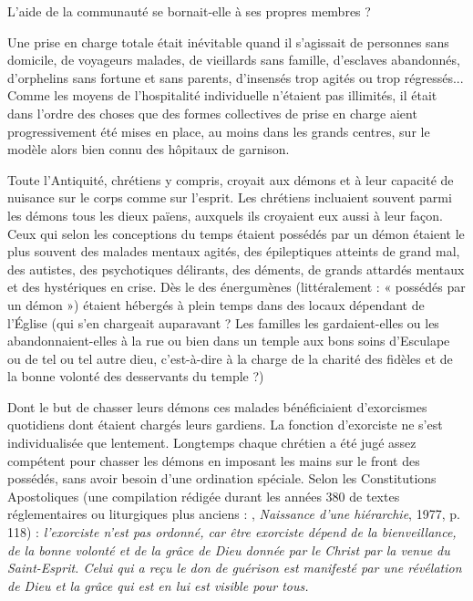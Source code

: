 L'aide de la communauté se bornait-elle à ses propres membres ? 

 Une prise en charge totale était inévitable quand il s'agissait de personnes sans domicile, de voyageurs malades, de vieillards sans famille, d'esclaves abandonnés, d'orphelins sans fortune et sans parents, d'insensés trop agités ou trop régressés... Comme les moyens de l'hospitalité individuelle n'étaient pas illimités, il était dans l'ordre des choses que des formes collectives de prise en charge aient progressivement été mises en place, au moins dans les grands centres, sur le modèle alors bien connu des hôpitaux de garnison. 



Toute l'Antiquité, chrétiens y compris, croyait aux démons et à leur capacité de nuisance sur le corps comme sur l'esprit. Les chrétiens incluaient souvent parmi les démons tous les dieux païens, auxquels ils croyaient eux aussi à leur façon. Ceux qui selon les conceptions du temps étaient possédés par un démon étaient le plus souvent des malades mentaux agités, des épileptiques atteints de grand mal, des autistes, des psychotiques délirants, des déments, de grands attardés mentaux et des hystériques en crise. Dès le  des énergumènes (littéralement : « possédés par un démon ») étaient hébergés à plein temps dans des locaux dépendant de l'Église (qui s'en chargeait auparavant ? Les familles les gardaient-elles ou les abandonnaient-elles à la rue ou bien dans un temple aux bons soins d'Esculape ou de tel ou tel autre dieu, c'est-à-dire à la charge de la charité des fidèles et de la bonne volonté des desservants du temple ?) 

 Dont le but de chasser leurs démons ces malades bénéficiaient d'exorcismes quotidiens dont étaient chargés leurs gardiens. La fonction d'exorciste ne s'est individualisée que lentement. Longtemps chaque chrétien a été jugé assez compétent pour chasser les démons en imposant les mains sur le front des possédés, sans avoir besoin d'une ordination spéciale. Selon les Constitutions Apostoliques (une compilation rédigée durant les années 380 de textes réglementaires ou liturgiques plus anciens : , \emph{Naissance d'une hiérarchie}, 1977, p. 118) : \emph{l'exorciste n'est pas ordonné, car être exorciste dépend de la bienveillance, de la bonne volonté et de la grâce de Dieu donnée par le Christ par la venue du Saint-Esprit. Celui qui a reçu le don de guérison est manifesté par une révélation de Dieu et la grâce qui est en lui est visible pour tous.}


